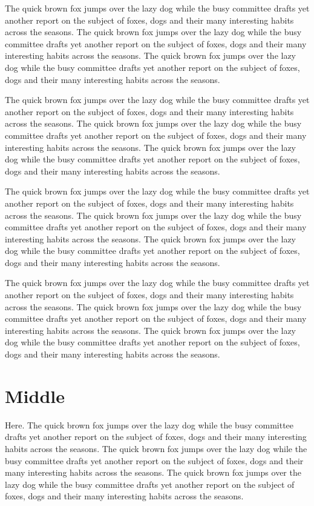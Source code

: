 \documentclass{article}
\begin{document}
The quick brown fox jumps over the lazy dog while the busy committee drafts yet another report on the subject of foxes, dogs and their many interesting habits across the seasons. The quick brown fox jumps over the lazy dog while the busy committee drafts yet another report on the subject of foxes, dogs and their many interesting habits across the seasons. The quick brown fox jumps over the lazy dog while the busy committee drafts yet another report on the subject of foxes, dogs and their many interesting habits across the seasons. 

The quick brown fox jumps over the lazy dog while the busy committee drafts yet another report on the subject of foxes, dogs and their many interesting habits across the seasons. The quick brown fox jumps over the lazy dog while the busy committee drafts yet another report on the subject of foxes, dogs and their many interesting habits across the seasons. The quick brown fox jumps over the lazy dog while the busy committee drafts yet another report on the subject of foxes, dogs and their many interesting habits across the seasons. 

The quick brown fox jumps over the lazy dog while the busy committee drafts yet another report on the subject of foxes, dogs and their many interesting habits across the seasons. The quick brown fox jumps over the lazy dog while the busy committee drafts yet another report on the subject of foxes, dogs and their many interesting habits across the seasons. The quick brown fox jumps over the lazy dog while the busy committee drafts yet another report on the subject of foxes, dogs and their many interesting habits across the seasons. 

The quick brown fox jumps over the lazy dog while the busy committee drafts yet another report on the subject of foxes, dogs and their many interesting habits across the seasons. The quick brown fox jumps over the lazy dog while the busy committee drafts yet another report on the subject of foxes, dogs and their many interesting habits across the seasons. The quick brown fox jumps over the lazy dog while the busy committee drafts yet another report on the subject of foxes, dogs and their many interesting habits across the seasons. 

\section{Middle}\label{mid} Here.\label{here}
The quick brown fox jumps over the lazy dog while the busy committee drafts yet another report on the subject of foxes, dogs and their many interesting habits across the seasons. The quick brown fox jumps over the lazy dog while the busy committee drafts yet another report on the subject of foxes, dogs and their many interesting habits across the seasons. The quick brown fox jumps over the lazy dog while the busy committee drafts yet another report on the subject of foxes, dogs and their many interesting habits across the seasons. 
\end{document}
